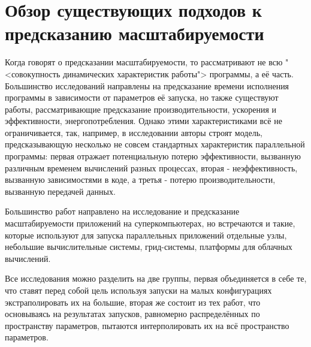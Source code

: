 \section{Обзор существующих подходов к предсказанию масштабируемости}
	Когда говорят о предсказании масштабируемости, то рассматривают не всю "<совокупность динамических характеристик работы"> программы, а её часть. Большинство исследований направлены на предсказание времени исполнения программы в зависимости от параметров её запуска, но также существуют работы, рассматривающие предсказание производительности, ускорения и эффективности, энергопотребления. Однако этими характеристиками всё не ограничивается, так, например, в исследовании \cite{efficiency_prediction} авторы строят модель, предсказывающую несколько не совсем стандартных характеристик параллельной программы: первая отражает потенциальную потерю эффективности, вызванную различным временем вычислений разных процессах, вторая - неэффективность, вызванную зависимостями в коде, а третья - потерю производительности, вызванную передачей данных.

	Большинство работ направлено на исследование и предсказание масштабируемости приложений на суперкомпьютерах, но встречаются и такие, которые используют для запуска параллельных приложений отдельные узлы, небольшие вычислительные системы, грид-системы, платформы для облачных вычислений.

	Все исследования можно разделить на две группы, первая объединяется в себе те, что ставят перед собой цель используя запуски на малых конфигурациях экстраполировать их на большие, вторая же состоит из тех работ, что основываясь на результатах запусков, равномерно распределённых по пространству параметров, пытаются интерполировать их на всё пространство параметров.

